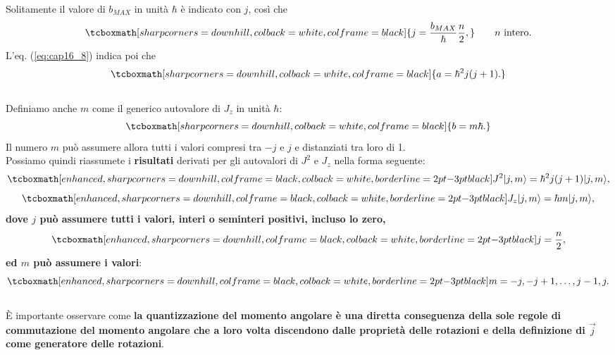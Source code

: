 \documentclass[a4paper,12pt,oneside]{book}
\begin{document}
Solitamente il valore di $b_{MAX}$ in unità $\hbar$ è indicato con $j$, così che
	\begin{equation}
		\tcboxmath[sharp corners=downhill, colback=white, colframe=black]{
			j= \frac{b_{MAX}}{\hbar} \frac{n}{2},
			} \qquad n \textrm{ intero.}
	\end{equation}
L'eq. (\ref{eq:cap16_8}) indica poi che
	\begin{equation}
		\tcboxmath[sharp corners=downhill, colback=white, colframe=black]{
			a= \hbar ^2 j(j+1).
			}
	\end{equation}\\

Definiamo anche $m$ come il generico autovalore di $J_z$ in unità $\hbar$:
	\begin{equation}
		\tcboxmath[sharp corners=downhill, colback=white, colframe=black]{
			b=m\hbar .
			}
	\end{equation}
Il numero $m$ può assumere allora tutti i valori compresi tra $-j$ e $j$ e distanziati tra loro di 1.\\

Possiamo quindi riassumete i \textbf{risultati} derivati per gli autovalori di $J^2$ e $J_z$ nella forma seguente:
	\begin{equation}
		 \tcboxmath[enhanced, sharp corners=downhill, colframe=black, colback=white, borderline={2pt}{-3pt}{black}]{
		 	J^2\vert j, m \rangle =\hbar ^2 j (j+1)\vert j, m \rangle , 
		 	}
	\end{equation}
	\begin{equation}
		 \tcboxmath[enhanced, sharp corners=downhill, colframe=black, colback=white, borderline={2pt}{-3pt}{black}]{
		 	J_z\vert j, m \rangle =\hbar  m\vert j, m \rangle ,
		 	}
	\end{equation}
\textbf{dove $j$ può assumere tutti i valori, interi o seminteri positivi, incluso  lo zero,}
	\begin{equation}
		\tcboxmath[enhanced, sharp corners=downhill, colframe=black, colback=white, borderline={2pt}{-3pt}{black}]{
			j= \frac{n}{2},
			}
	\end{equation}
\textbf{ed $m$ può assumere i valori}:
	\begin{equation}
		\tcboxmath[enhanced, sharp corners=downhill, colframe=black, colback=white, borderline={2pt}{-3pt}{black}]{
			m=-j, -j+1,\dots , j-1, j.
			}
	\end{equation}\\
	
È importante osservare come \textbf{la quantizzazione del momento angolare è una diretta conseguenza della sole regole di commutazione del momento  angolare che a loro volta discendono dalle proprietà delle rotazioni e della definizione di $\vec{j}$ come generatore delle rotazioni}.\\
\end{document}
